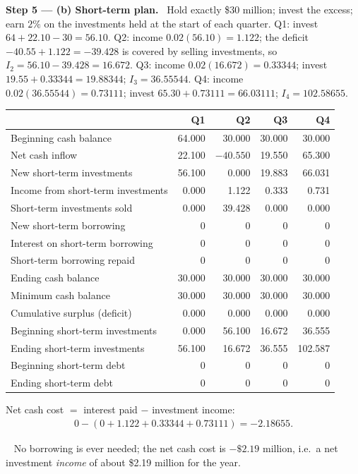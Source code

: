 \documentclass[11pt,a4paper]{article}
\newcommand{\step}[2]{\par\medskip\noindent\textbf{Step #1 --- #2.}~}
\newcommand{\answer}[1]{\par\smallskip\noindent\fbox{\textbf{Answer #1.}}~}
\begin{document}
\step{5}{(b) Short-term plan}
Hold exactly \$30 million; invest the excess; earn $2\%$ on the investments held at the start of
each quarter. Q1: invest $64 + 22.10 - 30 = 56.10$. Q2: income $0.02(56.10) = 1.122$; the deficit
$-40.55 + 1.122 = -39.428$ is covered by selling investments, so $I_2 = 56.10 - 39.428 = 16.672$.
Q3: income $0.02(16.672) = 0.33344$; invest $19.55 + 0.33344 = 19.88344$; $I_3 = 36.55544$. Q4:
income $0.02(36.55544) = 0.73111$; invest $65.30 + 0.73111 = 66.03111$; $I_4 = 102.58655$.
\begin{center}\small
\begin{tabular}{lrrrr}
\toprule
 & Q1 & Q2 & Q3 & Q4\\
\midrule
Beginning cash balance & 64.000 & 30.000 & 30.000 & 30.000\\
Net cash inflow & 22.100 & $-40.550$ & 19.550 & 65.300\\
New short-term investments & 56.100 & 0.000 & 19.883 & 66.031\\
Income from short-term investments & 0.000 & 1.122 & 0.333 & 0.731\\
Short-term investments sold & 0.000 & 39.428 & 0.000 & 0.000\\
New short-term borrowing & 0 & 0 & 0 & 0\\
Interest on short-term borrowing & 0 & 0 & 0 & 0\\
Short-term borrowing repaid & 0 & 0 & 0 & 0\\
Ending cash balance & 30.000 & 30.000 & 30.000 & 30.000\\
Minimum cash balance & 30.000 & 30.000 & 30.000 & 30.000\\
Cumulative surplus (deficit) & 0.000 & 0.000 & 0.000 & 0.000\\
Beginning short-term investments & 0.000 & 56.100 & 16.672 & 36.555\\
Ending short-term investments & 56.100 & 16.672 & 36.555 & 102.587\\
Beginning short-term debt & 0 & 0 & 0 & 0\\
Ending short-term debt & 0 & 0 & 0 & 0\\
\bottomrule
\end{tabular}
\end{center}
Net cash cost $=$ interest paid $-$ investment income:
\begin{align}
  0 - (0 + 1.122 + 0.33344 + 0.73111) = -2.18655. \label{r5be11-cost}
\end{align}

\answer{(b)} No borrowing is ever needed; the net cash cost is $-\$2.19$ million, i.e.\ a net
investment \emph{income} of about \$2.19 million for the year.
\end{document}
